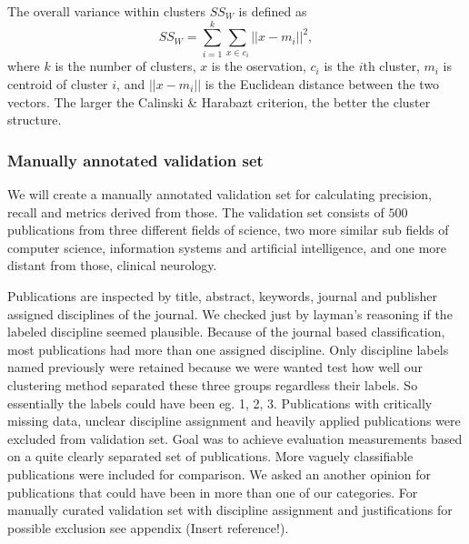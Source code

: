 The overall variance within clusters $SS_W$ is defined as
\begin{equation}
 SS_W = \sum_{i=1}^k \sum_{x\in c_i} ||x-m_i||^2,
\end{equation}
where $k$ is the number of clusters, $x$ is the oservation, 
$c_i$ is the $i$th cluster, $m_i$ is centroid of cluster $i$, and 
$||x-m_i||$ is the Euclidean distance between the two vectors.
The larger the Calinski \& Harabazt criterion, the better the 
cluster structure.



\subsubsection{Manually annotated validation set}
We will create a manually annotated validation set for calculating
precision, recall and metrics derived from those.
The validation
set consists of $500$ publications from three different fields of
science, two more similar sub fields of computer science, 
information systems and artificial intelligence, and one more
distant from those, clinical neurology.

Publications are inspected by title, abstract, keywords, journal
and publisher assigned disciplines of the journal. We checked 
just by layman's reasoning if the labeled discipline seemed 
plausible. Because of the journal based 
classification, most publications had more than one 
assigned discipline. Only discipline labels named 
previously were retained because we were wanted test 
how well our clustering method separated these three 
groups regardless their labels. So essentially the 
labels could have been eg. 1, 2, 3. Publications
with critically missing data, unclear discipline assignment and
heavily applied publications were excluded from validation set.
Goal was to achieve evaluation measurements based on a quite 
clearly separated set of publications. More vaguely classifiable
publications were included for comparison. We asked an another 
opinion for publications that could have been in more 
than one of our categories. For manually curated validation set 
with discipline assignment and justifications for
possible exclusion see appendix (Insert reference!).

